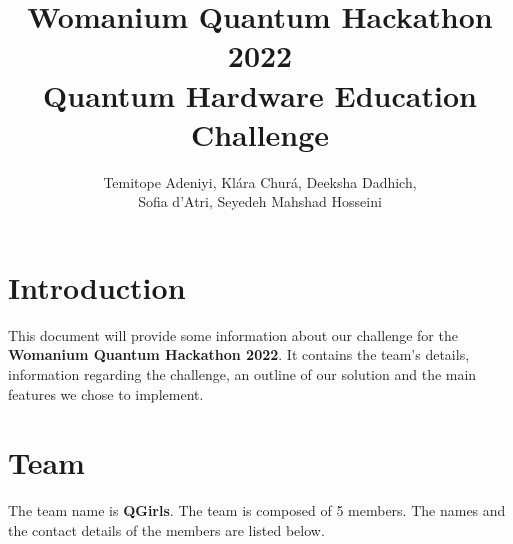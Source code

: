 \documentclass[hidelinks, a4paper,12pt]{article}
\title{Womanium Quantum Hackathon 2022\\Quantum Hardware Education Challenge}
\author{Temitope Adeniyi, Klára Churá, Deeksha Dadhich,\\Sofia d'Atri, Seyedeh Mahshad Hosseini}
\date{}
\begin{document}
\maketitle

\tableofcontents

\newpage
\section{Introduction}
This document will provide some information about our challenge for the \textbf{Womanium Quantum Hackathon 2022}. It contains the team's details, information regarding the challenge, an outline of our solution and the main features we chose to implement.

\section{Team}
The team name is \textbf{QGirls}. The team is composed of 5 members. The names and the contact details of the members are listed below.\\
\end{document}
